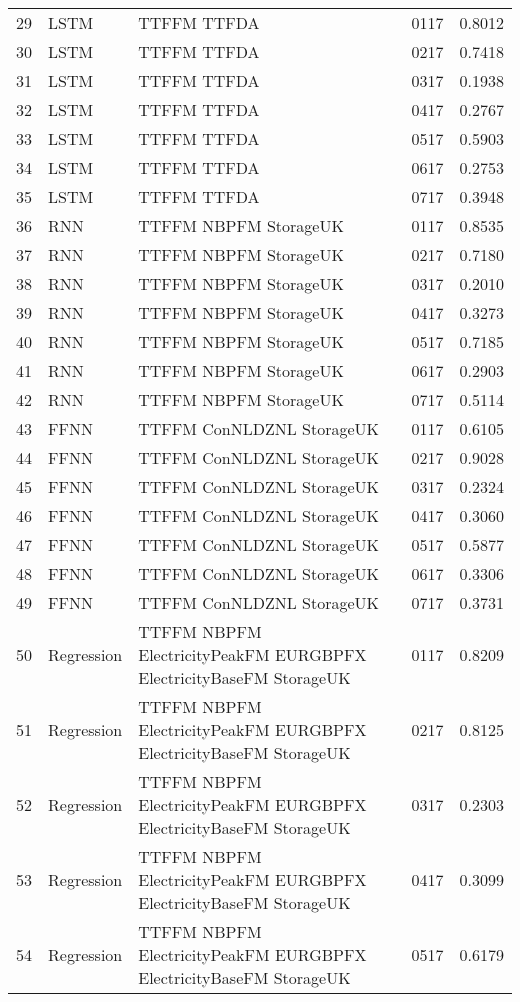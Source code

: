 \begin{table}[ht]
\begin{tabular}{rlllr}
  29 & LSTM & TTFFM TTFDA & 0117 & 0.8012 \\ 
  30 & LSTM & TTFFM TTFDA & 0217 & 0.7418 \\ 
  31 & LSTM & TTFFM TTFDA & 0317 & 0.1938 \\ 
  32 & LSTM & TTFFM TTFDA & 0417 & 0.2767 \\ 
  33 & LSTM & TTFFM TTFDA & 0517 & 0.5903 \\ 
  34 & LSTM & TTFFM TTFDA & 0617 & 0.2753 \\ 
  35 & LSTM & TTFFM TTFDA & 0717 & 0.3948 \\ 
  36 & RNN & TTFFM NBPFM StorageUK & 0117 & 0.8535 \\ 
  37 & RNN & TTFFM NBPFM StorageUK & 0217 & 0.7180 \\ 
  38 & RNN & TTFFM NBPFM StorageUK & 0317 & 0.2010 \\ 
  39 & RNN & TTFFM NBPFM StorageUK & 0417 & 0.3273 \\ 
  40 & RNN & TTFFM NBPFM StorageUK & 0517 & 0.7185 \\ 
  41 & RNN & TTFFM NBPFM StorageUK & 0617 & 0.2903 \\ 
  42 & RNN & TTFFM NBPFM StorageUK & 0717 & 0.5114 \\ 
  43 & FFNN & TTFFM ConNLDZNL StorageUK & 0117 & 0.6105 \\ 
  44 & FFNN & TTFFM ConNLDZNL StorageUK & 0217 & 0.9028 \\ 
  45 & FFNN & TTFFM ConNLDZNL StorageUK & 0317 & 0.2324 \\ 
  46 & FFNN & TTFFM ConNLDZNL StorageUK & 0417 & 0.3060 \\ 
  47 & FFNN & TTFFM ConNLDZNL StorageUK & 0517 & 0.5877 \\ 
  48 & FFNN & TTFFM ConNLDZNL StorageUK & 0617 & 0.3306 \\ 
  49 & FFNN & TTFFM ConNLDZNL StorageUK & 0717 & 0.3731 \\ 
  50 & Regression & TTFFM NBPFM ElectricityPeakFM EURGBPFX ElectricityBaseFM StorageUK & 0117 & 0.8209 \\ 
  51 & Regression & TTFFM NBPFM ElectricityPeakFM EURGBPFX ElectricityBaseFM StorageUK & 0217 & 0.8125 \\ 
  52 & Regression & TTFFM NBPFM ElectricityPeakFM EURGBPFX ElectricityBaseFM StorageUK & 0317 & 0.2303 \\ 
  53 & Regression & TTFFM NBPFM ElectricityPeakFM EURGBPFX ElectricityBaseFM StorageUK & 0417 & 0.3099 \\ 
  54 & Regression & TTFFM NBPFM ElectricityPeakFM EURGBPFX ElectricityBaseFM StorageUK & 0517 & 0.6179 \\ 

\end{tabular}
\end{table}
